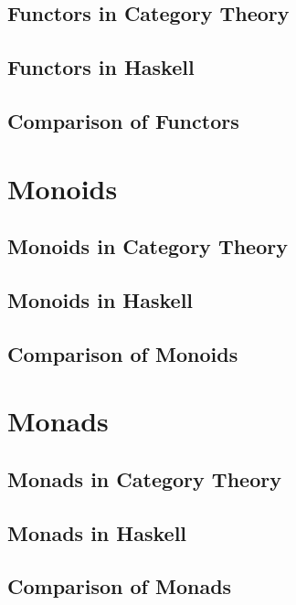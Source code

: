 \documentclass{article}
\begin{document}
\subsection{Functors in Category Theory}
\subsection{Functors in Haskell}
\subsection{Comparison of Functors}
\section{Monoids}
\subsection{Monoids in Category Theory}
\subsection{Monoids in Haskell}
\subsection{Comparison of Monoids}
\section{Monads}
\subsection{Monads in Category Theory}
\subsection{Monads in Haskell}
\subsection{Comparison of Monads}

\newpage
\printbibliography
\end{document}
